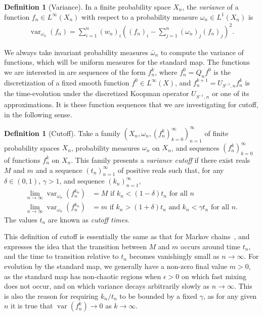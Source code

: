 \documentclass{aims}
\theoremstyle{definition}
\newtheorem{definition}[theorem]{Definition}
\begin{document}
\begin{definition}[Variance]
  \label{def:variance}
  In a finite probability space $X_n$, the \emph{variance} of a
  function $f_n \in L^\infty(X_n)$ with respect to a probability
  measure $\omega_n \in L^1(X_n)$ is
  \begin{align}
    \label{eqn:variance}
    \operatorname{var}_{\omega_n}(f_n) = \sum_{i=1}^n (w_n)_i \left(
      (f_n)_i - \sum_{j=1}^n (\omega_n)_j (f_n)_j \right)^2.
  \end{align}
\end{definition}

We always take invariant probability measures $\bar{\omega}_n$ to
compute the variance of functions, which will be uniform measures for
the standard map. The functions we are interested in are sequences of
the form $f_n^k$, where $f_n^0 = Q_n f^0$ is the discretization of a
fixed smooth function $f^0 \in L^\infty(X)$, and $f_n^{k+1} =
U_{S^{-1},n} f_n^k$ is the time-evolution under the discretized
Koopman operator $U_{S^{-1},n}$ or one of its approximations. It is
these function sequences that we are investigating for cutoff, in the
following sense.

\begin{definition}[Cutoff]
  \label{cutoffdefinition}
  Take a family $(X_n, \omega_n,
  (f^k_n)_{k=0}^{\infty})_{n=1}^{\infty}$ of finite probability spaces
  $X_n$, probability measures $\omega_n$ on $X_n$, and sequences
  $(f_n^k)_{k=0}^{\infty}$ of functions $f_n^k$ on $X_n$. This family
  presents a \emph{variance cutoff} if there exist reals $M$ and $m$
  and a sequence $(t_n)_{n=1}^{\infty}$ of positive reals such that,
  for any $\delta \in (0,1)$, $\gamma > 1$, and sequence
  $(k_n)_{n=1}^{\infty}$,
  \begin{subequations}
    \label{eqn:defn_cutoff}
    \begin{align}
      \lim_{n \rightarrow \infty}
      \operatorname{var}_{\omega_n}(f_n^{k_n}) &= M \text{ if }
      k_n < (1-\delta)t_n \text{ for all } n \\
      \lim_{n \rightarrow \infty}
      \operatorname{var}_{\omega_n}(f_n^{k_n}) &= m \text{ if }
      k_n > (1+\delta)t_n \text{ and } k_n < \gamma t_n \text{ for all } n.
    \end{align}
  \end{subequations}
  The values $t_n$ are known as \emph{cutoff times}.
\end{definition}

This definition of cutoff is essentially the same as that for Markov
chains~\cite{Diaconis2005}, and expresses the idea that the transition
between $M$ and $m$ occurs around time $t_n$, and the time to
transition relative to $t_n$ becomes vanishingly small as $n \to
\infty$. For evolution by the standard map, we generally have a
non-zero final value $m > 0$, as the standard map has non-chaotic
regions when $\epsilon > 0$ on which fast mixing does not occur, and
on which variance decays arbitrarily slowly as $n \to \infty$. This is
also the reason for requiring $k_n/t_n$ to be bounded by a fixed
$\gamma$, as for any given $n$ it is true that
$\operatorname{var}(f_n^k) \to 0$ as $k \to \infty$.
\end{document}
